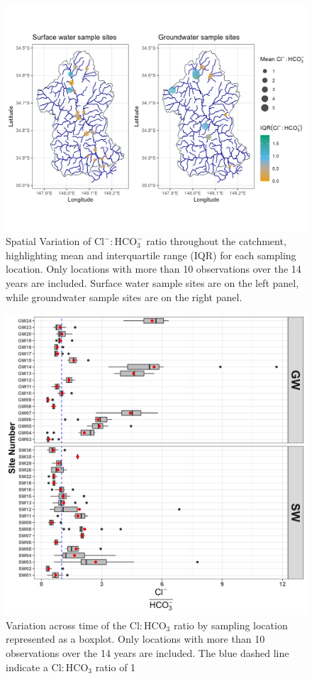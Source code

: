 \documentclass[, manuscript]{copernicus}
\begin{document}
\clearpage

\begin{figure}
\includegraphics[width=0.8\linewidth]{Figures/clhco3_map} \caption{Spatial Variation of $\mathrm{Cl^-:HCO_3^-}$ ratio throughout the catchment, highlighting mean and interquartile range (IQR) for each sampling location. Only locations with more than 10 observations over the 14 years are included. Surface water sample sites are on the left panel, while groundwater sample sites are on the right panel.}\label{fig:Carbonate-map}
\end{figure}

\clearpage

\begin{figure}
\includegraphics[width=0.8\linewidth]{Figures/clhco3_plot} \caption{Variation across time of the $\mathrm{Cl:HCO_3}$ ratio by sampling location represented as a boxplot. Only locations with more than 10 observations over the 14 years are included. The blue dashed line indicate a $\mathrm{Cl:HCO_3}$ ratio of 1}\label{fig:Carbonate-boxplot}
\end{figure}
\end{document}
